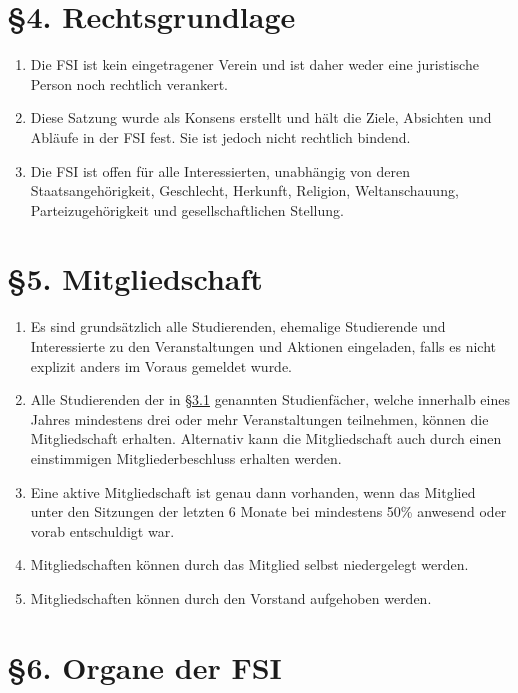 \documentclass[12pt]{article}
\begin{document}
\section*{§4. Rechtsgrundlage}

\begin{enumerate}
	\item
		Die FSI ist kein eingetragener Verein und ist daher weder eine
		juristische Person noch rechtlich verankert.
	\item
		Diese Satzung wurde als Konsens erstellt und hält die Ziele,
		Absichten und Abläufe in der FSI fest. Sie ist jedoch nicht
		rechtlich bindend.
    	\item
		Die FSI ist offen für alle Interessierten, unabhängig von deren
		Staatsangehörigkeit, Geschlecht, Herkunft, Religion,
		Weltanschauung, Parteizugehörigkeit und gesellschaftlichen
		Stellung.
\end{enumerate}

\section*{§5. Mitgliedschaft}

\begin{enumerate}
	\item
		Es sind grundsätzlich alle Studierenden, ehemalige Studierende
		und Interessierte zu den Veranstaltungen und Aktionen
		eingeladen, falls es nicht explizit anders im Voraus gemeldet
		wurde.
    	\item
		Alle Studierenden der in \hyperref[3.1]{§3.1} genannten Studienfächer, welche innerhalb
		eines Jahres mindestens drei oder mehr Veranstaltungen
		teilnehmen, können die Mitgliedschaft erhalten. Alternativ kann
		die Mitgliedschaft auch durch einen einstimmigen
		Mitgliederbeschluss erhalten werden.
	\item
		Eine aktive Mitgliedschaft ist genau dann vorhanden, wenn das
		Mitglied unter den Sitzungen der letzten 6 Monate bei mindestens
		50\% anwesend oder vorab entschuldigt war.
	\item
		Mitgliedschaften können durch das Mitglied selbst niedergelegt
		werden.
	\item 	Mitgliedschaften können durch den Vorstand aufgehoben werden.
\end{enumerate}

\section*{§6. Organe der FSI}
\end{document}
